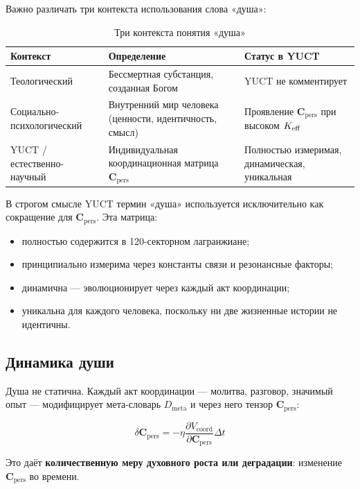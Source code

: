 \documentclass[12pt,a4paper]{article}
\newcommand{\Cpers}{\mathbf{C}_{\text{pers}}}
\begin{document}
	Важно различать три контекста использования слова «душа»:
	
	\begin{table}[H]
		\centering
		\caption{Три контекста понятия «душа»}
		\label{tab:soul-contexts}
		\begin{tabular}{p{3.5cm}p{5cm}p{5cm}}
			\toprule
			\textbf{Контекст} & \textbf{Определение} & \textbf{Статус в YUCT} \\
			\midrule
			Теологический & Бессмертная субстанция, созданная Богом & YUCT не комментирует \\
			Социально-психологический & Внутренний мир человека (ценности, идентичность, смысл) & Проявление \(\Cpers\) при высоком \(\Keff\) \\
			YUCT / естественно-научный & Индивидуальная координационная матрица \(\Cpers\) & Полностью измеримая, динамическая, уникальная \\
			\bottomrule
		\end{tabular}
	\end{table}
	
	В строгом смысле YUCT термин «душа» используется исключительно как сокращение для \(\Cpers\). Эта матрица:
	\begin{itemize}
		\item полностью содержится в 120-секторном лагранжиане;
		\item принципиально измерима через константы связи и резонансные факторы;
		\item динамична — эволюционирует через каждый акт координации;
		\item уникальна для каждого человека, поскольку ни две жизненные истории не идентичны.
	\end{itemize}
	
	\subsection{Динамика души}
	
	Душа не статична. Каждый акт координации — молитва, разговор, значимый опыт — модифицирует мета-словарь \(D_{\text{meta}}\) и через него тензор \(\Cpers\):
	
	\begin{equation}
		\delta \Cpers = -\eta \frac{\partial V_{\text{coord}}}{\partial \Cpers} \Delta t
	\end{equation}
	
	Это даёт \textbf{количественную меру духовного роста или деградации}: изменение \(\Cpers\) во времени.
	
\end{document}
